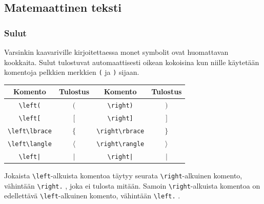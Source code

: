 \subsection{Matemaattinen teksti}
\begin{frame}[fragile]
    \frametitle{Sulut}
    Varsinkin kaavariville kirjoitettaessa monet symbolit ovat huomattavan kookkaita. Sulut tulostuvat automaattisesti oikean kokoisina kun niille käytetään komentoja pelkkien merkkien \lstinline-(- ja \lstinline-)- sijaan. \vaihto
    \begin{tabular}{cc|cc}
        Komento & Tulostus & Komento & Tulostus\\
        \hline
        \lstinline-\left(- & \(\left(\right.\) & \lstinline-\right)-& \(\left.\right)\)\\
        \lstinline-\left[- & \(\left[\right.\) & \lstinline-\right]-& \(\left.\right]\)\\
        \lstinline-\left\lbrace- & \(\left\lbrace\right.\) & \lstinline-\right\rbrace- & \(\left.\right\rbrace\)\\
        \lstinline-\left\langle- & \(\left\langle\right.\) & \lstinline-\right\rangle- & \(\left.\right\rangle\)\\
        \lstinline-\left|- & \(\left|\right.\) & \lstinline-\right|- & \(\left.\right|\)\\
    \end{tabular}
    \vaihto
    Jokaista \lstinline-\left--alkuista komentoa täytyy seurata \lstinline-\right--alkuinen komento, vähintään \lstinline-\right.- , joka ei tulosta mitään. Samoin \lstinline-\right--alkuista komentoa on edellettävä \lstinline-\left--alkuinen komento, vähintään \lstinline-\left.- . 
\end{frame}

\begin{frame}[fragile]
    
\end{frame}
\begin{frame}[fragile]
    
\end{frame}

